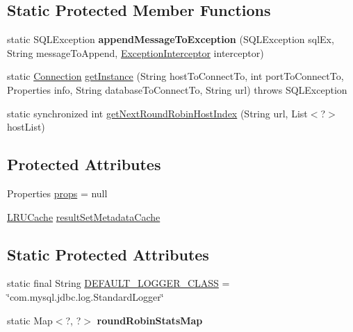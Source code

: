 \subsection*{Static Protected Member Functions}
\begin{DoxyCompactItemize}
\item 
\mbox{\label{classcom_1_1mysql_1_1jdbc_1_1_connection_impl_aec1994a087ab039307c589ceee3a2725}} 
static S\+Q\+L\+Exception {\bfseries append\+Message\+To\+Exception} (S\+Q\+L\+Exception sql\+Ex, String message\+To\+Append, \mbox{\hyperlink{interfacecom_1_1mysql_1_1jdbc_1_1_exception_interceptor}{Exception\+Interceptor}} interceptor)
\item 
static \mbox{\hyperlink{interfacecom_1_1mysql_1_1jdbc_1_1_connection}{Connection}} \mbox{\hyperlink{classcom_1_1mysql_1_1jdbc_1_1_connection_impl_afda2c6f126087c49737afee5bc053e32}{get\+Instance}} (String host\+To\+Connect\+To, int port\+To\+Connect\+To, Properties info, String database\+To\+Connect\+To, String url)  throws S\+Q\+L\+Exception 
\item 
static synchronized int \mbox{\hyperlink{classcom_1_1mysql_1_1jdbc_1_1_connection_impl_ad1bdffcbc78f4b474b82f76101ebdf63}{get\+Next\+Round\+Robin\+Host\+Index}} (String url, List$<$?$>$ host\+List)
\end{DoxyCompactItemize}
\subsection*{Protected Attributes}
\begin{DoxyCompactItemize}
\item 
Properties \mbox{\hyperlink{classcom_1_1mysql_1_1jdbc_1_1_connection_impl_aa7d079ae0cce7005b0f2a43cdbf9527f}{props}} = null
\item 
\mbox{\hyperlink{classcom_1_1mysql_1_1jdbc_1_1util_1_1_l_r_u_cache}{L\+R\+U\+Cache}} \mbox{\hyperlink{classcom_1_1mysql_1_1jdbc_1_1_connection_impl_a1b101ff651d579ed0ce9d196ba76ad9f}{result\+Set\+Metadata\+Cache}}
\end{DoxyCompactItemize}
\subsection*{Static Protected Attributes}
\begin{DoxyCompactItemize}
\item 
static final String \mbox{\hyperlink{classcom_1_1mysql_1_1jdbc_1_1_connection_impl_a7e187b6786ca824769376a7e5e86eadf}{D\+E\+F\+A\+U\+L\+T\+\_\+\+L\+O\+G\+G\+E\+R\+\_\+\+C\+L\+A\+SS}} = \char`\"{}com.\+mysql.\+jdbc.\+log.\+Standard\+Logger\char`\"{}
\item 
\mbox{\label{classcom_1_1mysql_1_1jdbc_1_1_connection_impl_a495dd070f642ee1db39b2cc10cea01a1}} 
static Map$<$?, ?$>$ {\bfseries round\+Robin\+Stats\+Map}
\end{DoxyCompactItemize}


